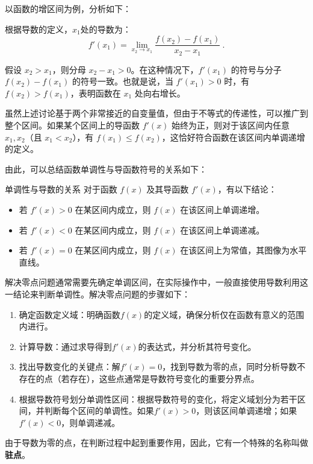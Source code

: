 以函数的增区间为例，分析如下：

根据导数的定义，$x_1$处的导数为：
\begin{equation}
f'(x_1) = \lim_{x_2 \to x_1} \frac{f(x_2) - f(x_1)}{x_2 - x_1}~.
\end{equation}

假设 $x_2 > x_1$，则分母 $x_2 - x_1 > 0$。在这种情况下，$f'(x_1)$ 的符号与分子 $f(x_2) - f(x_1)$ 的符号一致。也就是说，当 $f'(x_1) > 0$ 时，有 $f(x_2) > f(x_1)$，表明函数在 $x_1$ 处向右增长。

虽然上述讨论基于两个非常接近的自变量值，但由于不等式的传递性，可以推广到整个区间。如果某个区间上的导函数 $f'(x)$ 始终为正，则对于该区间内任意 $x_1, x_2$（且 $x_1 < x_2$），有 $f(x_1) \leq f(x_2)$，这恰好符合函数在该区间内单调递增的定义。

由此，可以总结函数单调性与导函数符号的关系如下：

\begin{theorem}{单调性与导数的关系}
对于函数 $f(x)$ 及其导函数 $f'(x)$，有以下结论：
\begin{itemize}
\item 若 $f'(x) > 0$ 在某区间内成立，则 $f(x)$ 在该区间上单调递增。
\item 若 $f'(x) < 0$ 在某区间内成立，则 $f(x)$ 在该区间上单调递减。
\item 若 $f'(x) = 0$ 在某区间内成立，则 $f(x)$ 在该区间上为常值，其图像为水平直线。
\end{itemize}
\end{theorem}

解决零点问题通常需要先确定单调区间，在实际操作中，一般直接使用导数利用这一结论来判断单调性。解决零点问题的步骤如下：

\begin{enumerate}
\item 确定函数定义域：明确函数$f(x)$的定义域，确保分析仅在函数有意义的范围内进行。
\item 计算导数：通过求导得到$f'(x)$的表达式，并分析其符号变化。
\item 找出导数变化的关键点：解$f'(x) = 0$，找到导数为零的点，同时分析导数不存在的点（若存在），这些点通常是导数符号变化的重要分界点。
\item 根据导数符号划分单调性区间：根据导数符号的变化，将定义域划分为若干区间，并判断每个区间的单调性。如果$f'(x) > 0$，则该区间单调递增；如果$f'(x) < 0$，则单调递减。
\end{enumerate}

由于导数为零的点，在判断过程中起到重要作用，因此，它有一个特殊的名称叫做\textbf{驻点}。

